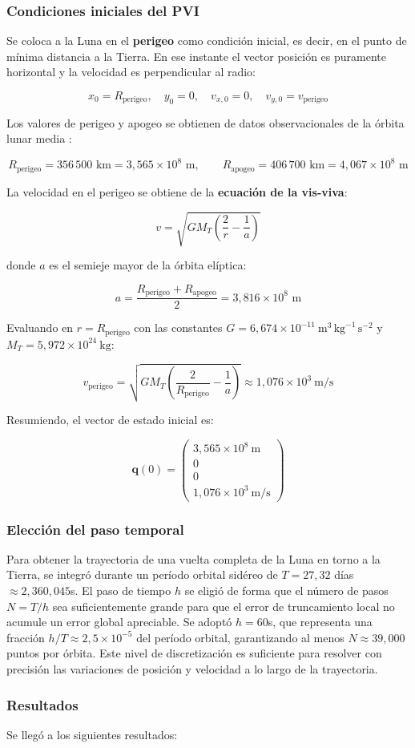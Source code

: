 \subsubsection{Condiciones iniciales del PVI}

Se coloca a la Luna en el \textbf{perigeo} como condición inicial, es decir, en el punto de mínima
distancia a la Tierra. En ese instante el vector posición es puramente horizontal y la velocidad
es perpendicular al radio:

\[
x_0 = R_{\text{perigeo}}, \quad y_0 = 0, \quad v_{x,0} = 0, \quad v_{y,0} = v_{\text{perigeo}}
\]

Los valores de perigeo y apogeo se obtienen de datos observacionales de la órbita lunar
media \cite{nasa_horizons}:

\[
R_{\text{perigeo}} = 356\,500 \text{ km} = 3{,}565 \times 10^{8} \text{ m}, \qquad
R_{\text{apogeo}}  = 406\,700 \text{ km} = 4{,}067 \times 10^{8} \text{ m}
\]

La velocidad en el perigeo se obtiene de la \textbf{ecuación de la vis-viva}:

\[
v = \sqrt{G M_T \left(\frac{2}{r} - \frac{1}{a}\right)}
\]

donde $a$ es el semieje mayor de la órbita elíptica:

\[
a = \frac{R_{\text{perigeo}} + R_{\text{apogeo}}}{2} = 3{,}816 \times 10^{8} \text{ m}
\]

Evaluando en $r = R_{\text{perigeo}}$ con las constantes
$G = 6{,}674 \times 10^{-11}\ \text{m}^3\,\text{kg}^{-1}\,\text{s}^{-2}$ y
$M_T = 5{,}972 \times 10^{24}\ \text{kg}$:

\[
v_{\text{perigeo}} = \sqrt{G M_T \left(\frac{2}{R_{\text{perigeo}}} - \frac{1}{a}\right)}
\approx 1{,}076 \times 10^{3}\ \text{m/s}
\]

Resumiendo, el vector de estado inicial es:

\[
\boxed{
\mathbf{q}(0) = \begin{pmatrix} 3{,}565 \times 10^{8}\ \text{m} \\ 0 \\ 0 \\ 1{,}076 \times 10^{3}\ \text{m/s} \end{pmatrix}
}
\]

\subsubsection{Elección del paso temporal}

Para obtener la trayectoria de una vuelta completa de la Luna en torno a la
Tierra, se integró durante un período orbital sidéreo de $T = 27{,}32$ días
$\approx 2{,}360{,}045$s. El paso de tiempo $h$ se
eligió de forma que el número de pasos $N = T/h$ sea suficientemente grande
para que el error de truncamiento local no acumule un error global apreciable.
Se adoptó $h = 60$s, que representa una fracción $h/T \approx 2{,}5 \times 10^{-5}$
del período orbital, garantizando al menos $N \approx 39{,}000$ puntos por
órbita. Este nivel de discretización es suficiente para resolver con precisión
las variaciones de posición y velocidad a lo largo de la trayectoria.

\subsubsection{Resultados}
Se llegó a los siguientes resultados:
